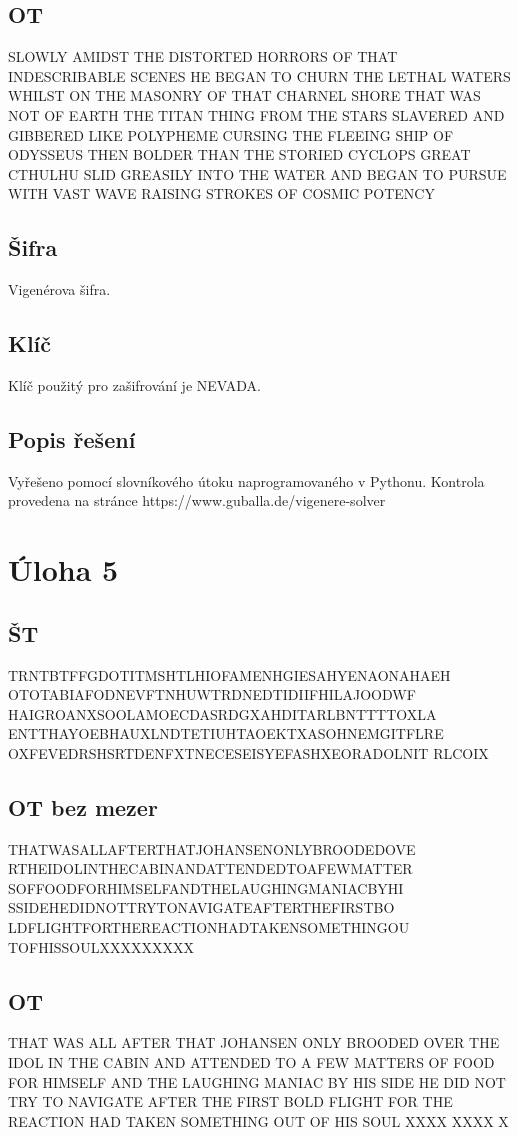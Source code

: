 \documentclass[12pt]{article} %
\begin{document}
\subsection{OT}
SLOWLY AMIDST THE DISTORTED HORRORS OF THAT 
INDESCRIBABLE SCENES HE BEGAN TO CHURN THE 
LETHAL WATERS WHILST ON THE MASONRY OF THAT 
CHARNEL SHORE THAT WAS NOT OF EARTH THE TITAN
THING FROM THE STARS SLAVERED AND GIBBERED LIKE
POLYPHEME CURSING THE FLEEING SHIP OF ODYSSEUS 
THEN BOLDER THAN THE STORIED CYCLOPS GREAT CTHULHU 
SLID GREASILY INTO THE WATER AND BEGAN TO PURSUE 
WITH VAST WAVE RAISING STROKES OF COSMIC POTENCY
\subsection{Šifra}
Vigenérova šifra.
\subsection{Klíč}
Klíč použitý pro zašifrování je NEVADA.
\subsection{Popis řešení}
Vyřešeno pomocí slovníkového útoku naprogramovaného v Pythonu. Kontrola provedena na stránce https://www.guballa.de/vigenere-solver

\section{Úloha 5}
\subsection{ŠT}
TRNTBTFFGDOTITMSHTLHIOFAMENHGIESAHYENAONAHAEH
OTOTABIAFODNEVFTNHUWTRDNEDTIDIIFHILAJOODWF
HAIGROANXSOOLAMOECDASRDGXAHDITARLBNTTTTOXLA
ENTTHAYOEBHAUXLNDTETIUHTAOEKTXASOHNEMGITFLRE
OXFEVEDRSHSRTDENFXTNECESEISYEFASHXEORADOLNIT
RLCOIX

\subsection{OT bez mezer}
THATWASALLAFTERTHATJOHANSENONLYBROODEDOVE
RTHEIDOLINTHECABINANDATTENDEDTOAFEWMATTER
SOFFOODFORHIMSELFANDTHELAUGHINGMANIACBYHI
SSIDEHEDIDNOTTRYTONAVIGATEAFTERTHEFIRSTBO
LDFLIGHTFORTHEREACTIONHADTAKENSOMETHINGOU
TOFHISSOULXXXXXXXXX
\subsection{OT}
THAT WAS ALL AFTER THAT JOHANSEN ONLY BROODED 
OVER THE IDOL IN THE CABIN AND ATTENDED TO A 
FEW MATTERS OF FOOD FOR HIMSELF AND THE LAUGHING 
MANIAC BY HIS SIDE HE DID NOT TRY TO NAVIGATE 
AFTER THE FIRST BOLD FLIGHT FOR THE REACTION 
HAD TAKEN SOMETHING OUT OF HIS SOUL XXXX XXXX X
\end{document}
